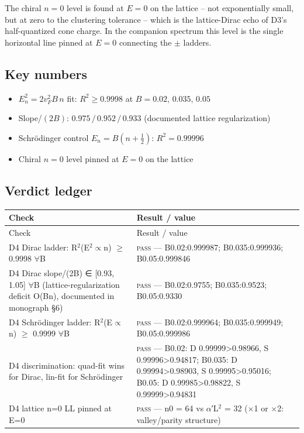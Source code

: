 \documentclass[11pt,a4paper]{article}
\begin{document}
The chiral $n = 0$ level is found at $E = 0$ on the lattice -- not exponentially small, but at zero to the clustering tolerance -- which is the lattice-Dirac echo of D3's half-quantized cone charge. In the companion spectrum this level is the single horizontal line pinned at $E=0$ connecting the $\pm$ ladders.

\subsection{Key numbers}
\begin{tcolorbox}[colback=labblue!6, colframe=labblue!70!black, boxrule=0.6pt, title={Key results (canonical run)}]
\begin{itemize}[leftmargin=1.2em, itemsep=0.15em]
\item $E_n^2 = 2v_F^2B\,n$ fit: $R^2 \geq 0.9998$ at $B = 0.02,\,0.035,\,0.05$
\item Slope/$(2B)$: $0.975\,/\,0.952\,/\,0.933$ (documented lattice regularization)
\item Schrödinger control $E_n = B(n+\frac{1}{2})$: $R^2 = 0.99996$
\item Chiral $n=0$ level pinned at $E = 0$ on the lattice
\end{itemize}
\end{tcolorbox}

\subsection{Verdict ledger}
\begin{longtable}{@{}p{}p{}@{}}
\toprule
Check & Result / value \\
\midrule
\endfirsthead
\toprule
Check & Result / value \\
\midrule
\endhead
\bottomrule
\endfoot
D4 Dirac ladder: R$^{2}$(E$^{2}$$\propto$n) $\ge$ 0.9998 $\forall$B & \textsc{pass} --- B0.02:0.999987; B0.035:0.999936; B0.05:0.999846 \\
D4 Dirac slope/(2B) ∈ [0.93, 1.05] $\forall$B (lattice-regularization deficit O(Bn), documented in monograph §6) & \textsc{pass} --- B0.02:0.9755; B0.035:0.9523; B0.05:0.9330 \\
D4 Schrödinger ladder: R$^{2}$(E$\propto$n) $\ge$ 0.9999 $\forall$B & \textsc{pass} --- B0.02:0.999964; B0.035:0.999949; B0.05:0.999986 \\
D4 discrimination: quad-fit wins for Dirac, lin-fit for Schrödinger & \textsc{pass} --- B0.02: D 0.99999>0.98966, S 0.99996>0.94817; B0.035: D 0.99994>0.98903, S 0.99995>0.95016; B0.05: D 0.99985>0.98822, S 0.99999>0.94831 \\
D4 lattice n=0 LL pinned at E=0 & \textsc{pass} --- n0 = 64 vs $\alpha$′L$^{2}$ = 32 ($\times$1 or $\times$2: valley/parity structure) \\
\end{longtable}
\end{document}

